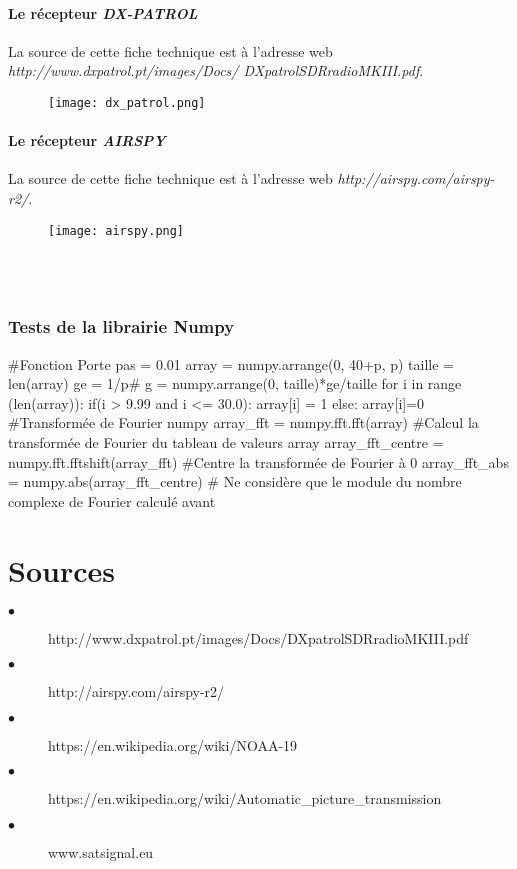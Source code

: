 \documentclass[12pt,fleqn]{book} %
\begin{document}
\subsection{Le récepteur \emph{DX-PATROL}}
La source de cette fiche technique est à l'adresse web \emph{http://www.dxpatrol.pt/images/Docs/ DXpatrolSDRradioMKIII.pdf}.
\begin{figure}[H]
	\centering
	\texttt{[image: dx\_patrol.png]}
 \end{figure}
\subsection{Le récepteur \emph{AIRSPY}}
La source de cette fiche technique est à l'adresse web \emph{http://airspy.com/airspy-r2/}.
 \begin{figure}[H]
	\centering
	\texttt{[image: airspy.png]}
 \end{figure}
~\\\\
\section{Tests de la librairie Numpy}
\begin{python}
 #Fonction Porte
 pas = 0.01
 array = numpy.arrange(0, 40+p, p)
 taille = len(array)
 ge = 1/p#
 g = numpy.arrange(0, taille)*ge/taille
 for i in range (len(array)):
     if(i > 9.99 and i <= 30.0):
          array[i] = 1
      else:
          array[i]=0
 #Transformée de Fourier numpy
 array_fft = numpy.fft.fft(array) #Calcul la transformée de Fourier du tableau de valeurs array
 array_fft_centre = numpy.fft.fftshift(array_fft) #Centre la transformée de Fourier à 0
 array_fft_abs = numpy.abs(array_fft_centre) # Ne considère que le module du nombre complexe de Fourier calculé avant
\end{python}
\setcounter{part}{-6}
\part{Sources}

\appendix

\begin{description}
\item[$\bullet$] http://www.dxpatrol.pt/images/Docs/DXpatrolSDRradioMKIII.pdf
\item[$\bullet$] http://airspy.com/airspy-r2/
\item[$\bullet$] https://en.wikipedia.org/wiki/NOAA-19
\item[$\bullet$] https://en.wikipedia.org/wiki/Automatic\_picture\_transmission
\item[$\bullet$] www.satsignal.eu
\end{description} 
\end{document}
